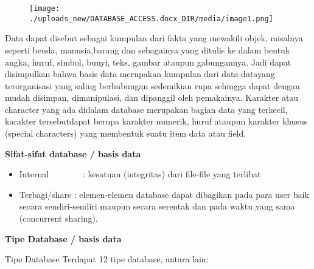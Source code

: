 \documentclass{wileySix}
\begin{document}
\vspace{12pt}
\noindent 
\begin{center}
	
	
	
	\begin{figure}[H]
		\begin{center}
			\texttt{[image: ./uploads\_new/DATABASE\_ACCESS.docx\_DIR/media/image1.png]}
		\end{center}
	\end{figure}
	
	
	
	
\end{center}\vspace{12pt}
\vspace{12pt}
Data dapat disebut sebagai kumpulan dari fakta yang mewakili objek, misalnya seperti benda, manusia,barang dan sebagainya yang ditulis ke dalam bentuk angka, huruf, simbol, bunyi, teks, gambar ataupun gabungannya. Jadi dapat disimpulkan bahwa basis data merupakan kumpulan dari data-datayang terorganisasi yang saling berhubungan sedemikian rupa sehingga dapat dengan mudah disimpan, dimanipulasi, dan dipanggil oleh pemakainya. Karakter atau character yang ada didalam database merupakan bagian data yang terkecil, karakter tersebutdapat berupa karakter numerik, huruf ataupun karakter khusus (special characters) yang membentuk suatu item data atau field. \par
\vspace{12pt}
\noindent 
\textbf{Sifat-sifat database / basis data} \par
\noindent 
\begin{itemize}
	\item Internal~~~~~~~~:  kesatuan (integritas) dari file-file yang terlibat \par
	\noindent 
	\item Terbagi/share : elemen-elemen database dapat dibagikan pada para user baik secara sendiri-sendiri maupun secara serentak dan pada waktu yang sama (concurrent sharing).\end{itemize}
\par
\vspace{12pt}
\noindent 
\textbf{Tipe Database / basis data} \par
\noindent 
Tipe Database Terdapat 12 tipe database, antara lain: \par
\noindent 
\end{document}

